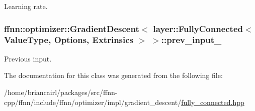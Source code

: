 Learning rate. 

\hypertarget{classffnn_1_1optimizer_1_1_gradient_descent_3_01layer_1_1_fully_connected_3_01_value_type_00_01_ddfb200b81fb62a6d9db0a043eb4e0ff_a460658037ced98085c44247a95c35441}{
\subsubsection[{prev\-\_\-input\-\_\-}]{ {\bf ffnn\-::optimizer\-::\-Gradient\-Descent}$<$ {\bf layer\-::\-Fully\-Connected}$<$ Value\-Type, Options, Extrinsics $>$ $>$\-::prev\-\_\-input\-\_\-\hspace{0.3cm}{\ttfamily [protected]}}}\label{classffnn_1_1optimizer_1_1_gradient_descent_3_01layer_1_1_fully_connected_3_01_value_type_00_01_ddfb200b81fb62a6d9db0a043eb4e0ff_a460658037ced98085c44247a95c35441}


Previous input. 



The documentation for this class was generated from the following file\-:\begin{DoxyCompactItemize}
\item 
/home/briancairl/packages/src/ffnn-\/cpp/ffnn/include/ffnn/optimizer/impl/gradient\-\_\-descent/\hyperlink{optimizer_2impl_2gradient__descent_2fully__connected_8hpp}{fully\-\_\-connected.\-hpp}\end{DoxyCompactItemize}
